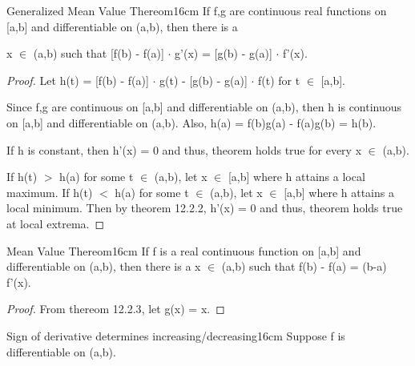     \vspace{0.5cm}



    \begin{wtheorem}{Generalized Mean Value Thereom}{16cm}
        If f,g are continuous real functions on [a,b] and differentiable on
        (a,b), then there is a
        
        x $\in$ (a,b) such that
        [f(b) - f(a)] $\cdot$ g'(x) = [g(b) - g(a)] $\cdot$ f'(x).        
    \end{wtheorem}

    \begin{proof}
        Let h(t) = [f(b) - f(a)] $\cdot$ g(t) - [g(b) - g(a)] $\cdot$ f(t)
        for t $\in$ [a,b].

        Since f,g are continuous on [a,b] and differentiable on (a,b),
        then h is continuous on [a,b] and differentiable on (a,b).
        Also, h(a) = f(b)g(a) - f(a)g(b) = h(b).

        If h is constant, then h'(x) = 0 and thus, theorem holds true for
        every x $\in$ (a,b).

        If h(t) $>$ h(a) for some t $\in$ (a,b), let x $\in$ [a,b] where
        h attains a local maximum.
        If h(t) $<$ h(a) for some t $\in$ (a,b), let x $\in$ [a,b] where
        h attains a local minimum.
        Then by {\color{red} theorem 12.2.2}, h'(x) = 0 and thus, theorem
        holds true at local extrema.
    \end{proof}

    \newpage



    \begin{wtheorem}{Mean Value Thereom}{16cm}
        If f is a real continuous function on [a,b] and differentiable on (a,b),
        then there is a x $\in$ (a,b) such that f(b) - f(a) = (b-a) f'(x).        
    \end{wtheorem}

    \begin{proof}
        From {\color{red} thereom 12.2.3}, let g(x) = x.
    \end{proof}

    \vspace{0.5cm}



    \begin{wtheorem}{Sign of derivative determines increasing/decreasing}{16cm}
        Suppose f is differentiable on (a,b).
    \end{wtheorem}

